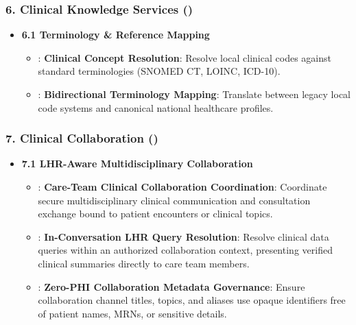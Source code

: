 \subsubsection*{6. Clinical Knowledge Services (\texttt{})}
\label{rad:enabling:637}

\begin{itemize}

\item 
\textbf{6.1 Terminology \& Reference Mapping}


\begin{itemize}

\item 
\texttt{}: \textbf{Clinical Concept Resolution}: Resolve local clinical codes against standard terminologies (SNOMED CT, LOINC, ICD-10).



\item 
\texttt{}: \textbf{Bidirectional Terminology Mapping}: Translate between legacy local code systems and canonical national healthcare profiles.



\end{itemize}


\end{itemize}
\label{rad:enabling:641}
\subsubsection*{7. Clinical Collaboration (\texttt{})}
\label{rad:enabling:642}

\begin{itemize}

\item 
\textbf{7.1 LHR-Aware Multidisciplinary Collaboration}


\begin{itemize}

\item 
\texttt{}: \textbf{Care-Team Clinical Collaboration Coordination}: Coordinate secure multidisciplinary clinical communication and consultation exchange bound to patient encounters or clinical topics.



\item 
\texttt{}: \textbf{In-Conversation LHR Query Resolution}: Resolve clinical data queries within an authorized collaboration context, presenting verified clinical summaries directly to care team members.



\item 
\texttt{}: \textbf{Zero-PHI Collaboration Metadata Governance}: Ensure collaboration channel titles, topics, and aliases use opaque identifiers free of patient names, MRNs, or sensitive details.



\end{itemize}


\end{itemize}
\label{rad:enabling:647}
